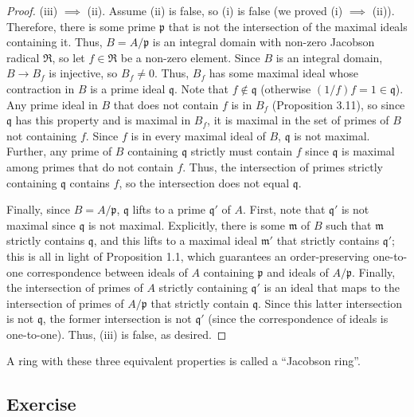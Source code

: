 \begin{proof}
(iii) $\implies$ (ii). Assume (ii) is false, so (i) is false (we proved (i) $\implies$ (ii)). Therefore, there is some prime $\mathfrak{p}$ that is not
the intersection of the maximal ideals containing it. Thus, $B = A/\mathfrak{p}$ is an integral domain with non-zero Jacobson radical $\mathfrak{R}$,
so let $f \in \mathfrak{R}$ be a non-zero element. Since $B$ is an integral domain, $B \to B_f$ is injective, so $B_f \neq 0$. Thus, $B_f$ has some
maximal ideal whose contraction in $B$ is a prime ideal $\mathfrak{q}$. Note that $f \not\in \mathfrak{q}$ (otherwise $(1/f)f = 1 \in \mathfrak{q}$).
Any prime ideal in $B$ that does not contain $f$ is in $B_f$ (Proposition 3.11), so since $\mathfrak{q}$ has this property and is maximal in $B_f$, it
is maximal in the set of primes of $B$ not containing $f$. Since $f$ is in every maximal ideal of $B$, $\mathfrak{q}$ is not maximal. Further, any prime
of $B$ containing $\mathfrak{q}$ strictly must contain $f$ since $\mathfrak{q}$ is maximal among primes that do not contain $f$. Thus, the intersection of
primes strictly containing $\mathfrak{q}$ contains $f$, so the intersection does not equal $\mathfrak{q}$. 

Finally, since $B = A/\mathfrak{p}$, $\mathfrak{q}$ lifts to a prime $\mathfrak{q}'$ of $A$. First, note that $\mathfrak{q}'$ is not maximal since $\mathfrak{q}$
is not maximal. Explicitly, there is some $\mathfrak{m}$ of $B$ such that $\mathfrak{m}$ strictly contains $\mathfrak{q}$, and this lifts to a maximal ideal
$\mathfrak{m}'$ that strictly contains $\mathfrak{q}'$; this is all in light of Proposition 1.1, which guarantees an order-preserving one-to-one correspondence
between ideals of $A$ containing $\mathfrak{p}$ and ideals of $A/\mathfrak{p}$. Finally, the intersection of primes of $A$ strictly containing $\mathfrak{q}'$ is
an ideal that maps to the intersection of primes of $A/\mathfrak{p}$ that strictly contain $\mathfrak{q}$. Since this latter intersection is not $\mathfrak{q}$,
the former intersection is not $\mathfrak{q}'$ (since the correspondence of ideals is one-to-one). Thus, (iii) is false, as desired.
\end{proof}

\begin{remark}
A ring with these three equivalent properties is called a ``Jacobson ring''.
\end{remark}

\subsection{Exercise}\label{5.24}

